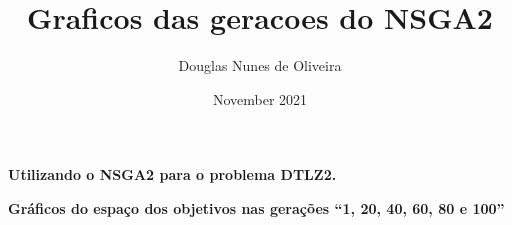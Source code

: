 \documentclass[11pt, a4paper]{report}
\title{Graficos das geracoes do NSGA2}
\author{Douglas Nunes de Oliveira}
\date{November 2021}
\begin{document}
    \begin{center}
        \textbf{Utilizando o NSGA2 para o problema DTLZ2.}
        
        \textbf{Gráficos do espaço dos objetivos nas gerações ``1, 20, 40, 60, 80 e 100''}
        
        
    \end{center}
    

    
    \hrulefill
    

    \newpage

    
    \hrulefill
    
    
    \newpage
    
    \hrulefill
    
    
    \newpage
    
    \hrulefill
\end{document}
